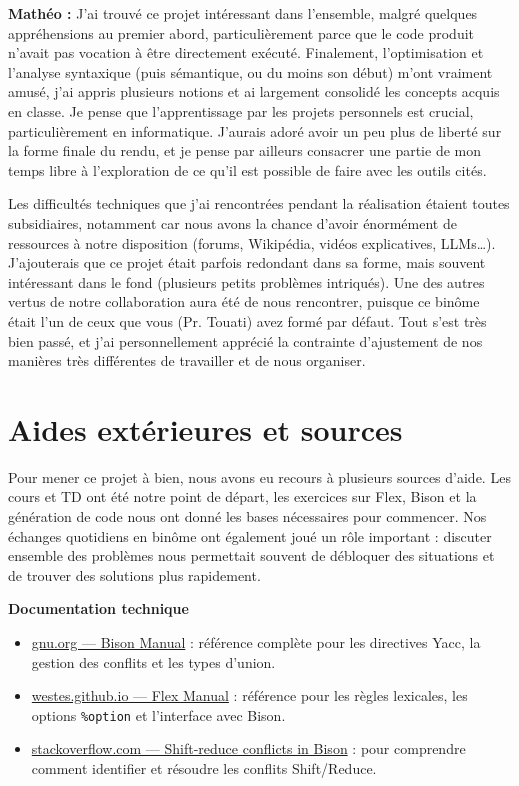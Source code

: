 \documentclass[12pt,a4paper]{article}
\begin{document}
\textbf{Mathéo :} J'ai trouvé ce projet intéressant dans l'ensemble, malgré quelques appréhensions au premier abord, particulièrement parce que le code produit n'avait pas vocation à être directement exécuté. Finalement, l'optimisation et l'analyse syntaxique (puis sémantique, ou du moins son début) m'ont vraiment amusé, j'ai appris plusieurs notions et ai largement consolidé les concepts acquis en classe. Je pense que l'apprentissage par les projets personnels est crucial, particulièrement en informatique. J'aurais adoré avoir un peu plus de liberté sur la forme finale du rendu, et je pense par ailleurs consacrer une partie de mon temps libre à l'exploration de ce qu'il est possible de faire avec les outils cités.

Les difficultés techniques que j'ai rencontrées pendant la réalisation étaient toutes subsidiaires, notamment car nous avons la chance d'avoir énormément de ressources à notre disposition (forums, Wikipédia, vidéos explicatives, LLMs\ldots). J'ajouterais que ce projet était parfois redondant dans sa forme, mais souvent intéressant dans le fond (plusieurs petits problèmes intriqués). Une des autres vertus de notre collaboration aura été de nous rencontrer, puisque ce binôme était l'un de ceux que vous (Pr. Touati) avez formé par défaut. Tout s'est très bien passé, et j'ai personnellement apprécié la contrainte d'ajustement de nos manières très différentes de travailler et de nous organiser.

\section{Aides extérieures et sources}

Pour mener ce projet à bien, nous avons eu recours à plusieurs sources d'aide. Les cours et TD ont été notre point de départ, les exercices sur Flex, Bison et la génération de code nous ont donné les bases nécessaires pour commencer. Nos échanges quotidiens en binôme ont également joué un rôle important : discuter ensemble des problèmes nous permettait souvent de débloquer des situations et de trouver des solutions plus rapidement.

\medskip
\textbf{Documentation technique}
\begin{itemize}
  \item \href{https://www.gnu.org/software/bison/manual/}{gnu.org --- Bison Manual} : référence complète pour les directives Yacc, la gestion des conflits et les types d'union.
  \item \href{https://westes.github.io/flex/manual/}{westes.github.io --- Flex Manual} : référence pour les règles lexicales, les options \texttt{\%option} et l'interface avec Bison.
  \item \href{https://stackoverflow.com/questions/1737460/how-to-find-shift-reduce-conflict-in-this-grammar}{stackoverflow.com --- Shift-reduce conflicts in Bison} : pour comprendre comment identifier et résoudre les conflits Shift/Reduce.
\end{itemize}
\end{document}
